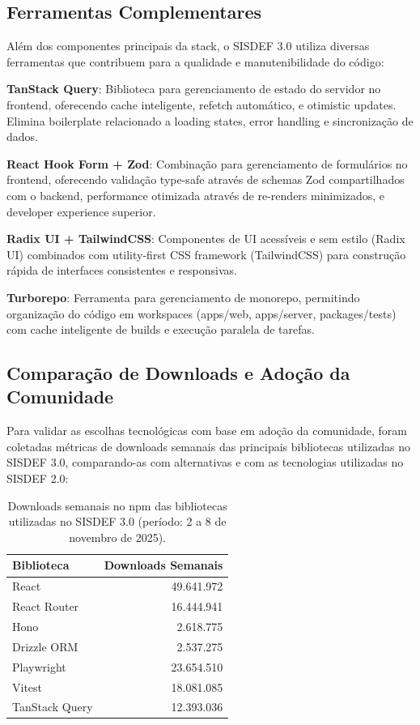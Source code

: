 \documentclass[nonacm, sigconf]{acmart}
\begin{document}
\subsection{Ferramentas Complementares}

Além dos componentes principais da stack, o SISDEF 3.0 utiliza diversas ferramentas que contribuem para a qualidade e manutenibilidade do código:

\textbf{TanStack Query}: Biblioteca para gerenciamento de estado do servidor no frontend, oferecendo cache inteligente, refetch automático, e otimistic updates. Elimina boilerplate relacionado a loading states, error handling e sincronização de dados.

\textbf{React Hook Form + Zod}: Combinação para gerenciamento de formulários no frontend, oferecendo validação type-safe através de schemas Zod compartilhados com o backend, performance otimizada através de re-renders minimizados, e developer experience superior.

\textbf{Radix UI + TailwindCSS}: Componentes de UI acessíveis e sem estilo (Radix UI) combinados com utility-first CSS framework (TailwindCSS) para construção rápida de interfaces consistentes e responsivas.

\textbf{Turborepo}: Ferramenta para gerenciamento de monorepo, permitindo organização do código em workspaces (apps/web, apps/server, packages/tests) com cache inteligente de builds e execução paralela de tarefas.

\subsection{Comparação de Downloads e Adoção da Comunidade}

Para validar as escolhas tecnológicas com base em adoção da comunidade, foram coletadas métricas de downloads semanais das principais bibliotecas utilizadas no SISDEF 3.0, comparando-as com alternativas e com as tecnologias utilizadas no SISDEF 2.0:

\begin{table}[ht]
  \caption{Downloads semanais no npm das bibliotecas utilizadas no SISDEF 3.0 (período: 2 a 8 de novembro de 2025).}
  \label{tab:npm-downloads}
  \centering
  \small
  \renewcommand{\arraystretch}{1.4}
  \begin{tabular}{l r}
    \toprule
    Biblioteca & Downloads Semanais \\
    \midrule
    React & 49.641.972 \\
    React Router & 16.444.941 \\
    Hono & 2.618.775 \\
    Drizzle ORM & 2.537.275 \\
    Playwright & 23.654.510 \\
    Vitest & 18.081.085 \\
    TanStack Query & 12.393.036 \\
    \bottomrule
  \end{tabular}
\end{table}
\end{document}
